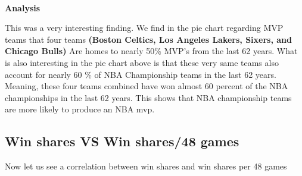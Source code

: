 \documentclass[11pt]{article}
\begin{document}
    \begin{center}
    \end{center}
    { \hspace*{\fill} \\}
    
    \textbf{Analysis} \newline

This was a very interesting finding. We find in the pie chart regarding
MVP teams that four teams \textbf{(Boston Celtics, Los Angeles Lakers,
Sixers, and Chicago Bulls)} Are homes to nearly 50\% MVP's from the last
62 years. What is also interesting in the pie chart above is that these
very same teams also account for nearly 60 \% of NBA Championship teams
in the last 62 years. Meaning, these four teams combined have won almost
60 percent of the NBA championships in the last 62 years. This shows
that NBA championship teams are more likely to produce an NBA mvp.

\subsection{Win shares VS Win shares/48
games}\label{win-shares-vs-win-shares48-games}

Now let us see a correlation between win shares and win shares per 48
games
\end{document}
